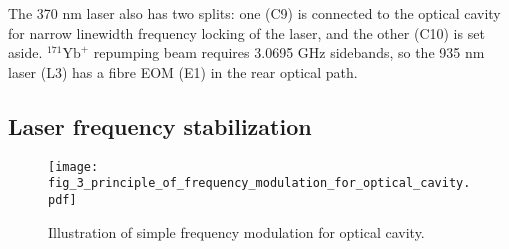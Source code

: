 The 370 nm laser also has two splits: one (C9) is connected to the optical cavity for narrow linewidth frequency locking of the laser, and the other (C10) is set aside. ${ }^{171} \mathrm{Yb}^{+}$ repumping beam requires 3.0695 GHz sidebands, so the 935 nm laser (L3) has a fibre EOM (E1) in the rear optical path.

\subsection{Laser frequency stabilization}

\begin{figure}
    \centering
    \texttt{[image: fig\_3\_principle\_of\_frequency\_modulation\_for\_optical\_cavity.pdf]}
    \caption{Illustration of simple frequency modulation for optical cavity.}
\end{figure}

